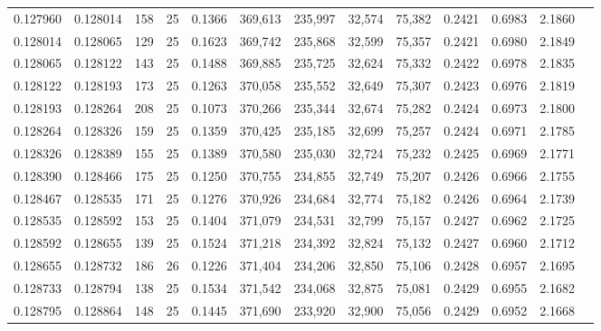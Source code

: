 \begin{tabular}{rrrrrrrrrrrrr}
0.127960 & 0.128014 &   158 &  25 &                                     0.1366 & 369,613 & 235,997 &  32,574 &  75,382 & 0.2421 & 0.6983 & 2.1860 \\
0.128014 & 0.128065 &   129 &  25 &                                     0.1623 & 369,742 & 235,868 &  32,599 &  75,357 & 0.2421 & 0.6980 & 2.1849 \\
0.128065 & 0.128122 &   143 &  25 &                                     0.1488 & 369,885 & 235,725 &  32,624 &  75,332 & 0.2422 & 0.6978 & 2.1835 \\
0.128122 & 0.128193 &   173 &  25 &                                     0.1263 & 370,058 & 235,552 &  32,649 &  75,307 & 0.2423 & 0.6976 & 2.1819 \\
0.128193 & 0.128264 &   208 &  25 &                                     0.1073 & 370,266 & 235,344 &  32,674 &  75,282 & 0.2424 & 0.6973 & 2.1800 \\
0.128264 & 0.128326 &   159 &  25 &                                     0.1359 & 370,425 & 235,185 &  32,699 &  75,257 & 0.2424 & 0.6971 & 2.1785 \\
0.128326 & 0.128389 &   155 &  25 &                                     0.1389 & 370,580 & 235,030 &  32,724 &  75,232 & 0.2425 & 0.6969 & 2.1771 \\
0.128390 & 0.128466 &   175 &  25 &                                     0.1250 & 370,755 & 234,855 &  32,749 &  75,207 & 0.2426 & 0.6966 & 2.1755 \\
0.128467 & 0.128535 &   171 &  25 &                                     0.1276 & 370,926 & 234,684 &  32,774 &  75,182 & 0.2426 & 0.6964 & 2.1739 \\
0.128535 & 0.128592 &   153 &  25 &                                     0.1404 & 371,079 & 234,531 &  32,799 &  75,157 & 0.2427 & 0.6962 & 2.1725 \\
0.128592 & 0.128655 &   139 &  25 &                                     0.1524 & 371,218 & 234,392 &  32,824 &  75,132 & 0.2427 & 0.6960 & 2.1712 \\
0.128655 & 0.128732 &   186 &  26 &                                     0.1226 & 371,404 & 234,206 &  32,850 &  75,106 & 0.2428 & 0.6957 & 2.1695 \\
0.128733 & 0.128794 &   138 &  25 &                                     0.1534 & 371,542 & 234,068 &  32,875 &  75,081 & 0.2429 & 0.6955 & 2.1682 \\
0.128795 & 0.128864 &   148 &  25 &                                     0.1445 & 371,690 & 233,920 &  32,900 &  75,056 & 0.2429 & 0.6952 & 2.1668 \\

\end{tabular}
